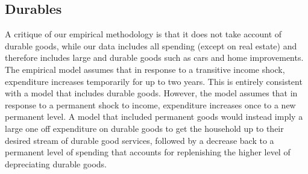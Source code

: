 \documentclass[titlepage]{\econtex}\newcommand{\texname}{ConsumptionHeterogeneity}
\begin{document}
\subsection{Durables} \label{durables}
A critique of our empirical methodology is that it does not take account of durable goods, while our data includes all spending (except on real estate) and therefore includes large and durable goods such as cars and home improvements. The empirical model assumes that in response to a transitive income shock, expenditure increases temporarily for up to two years. This is entirely consistent with a model that includes durable goods. However, the model assumes that in response to a permanent shock to income, expenditure increases once to a new permanent level. A model that included permanent goods would instead imply a large one off expenditure on durable goods to get the household up to their desired stream of durable good services, followed by a decrease back to a permanent level of spending that accounts for replenishing the higher level of depreciating durable goods.
\end{document}
